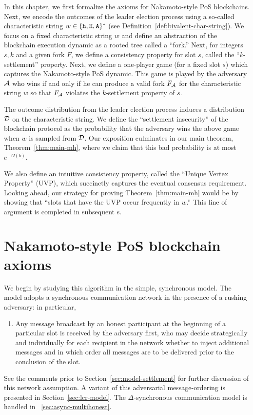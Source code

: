 

In this chapter, 
we first formalize the axioms for Nakamoto-style PoS blockchains. 
Next, we encode the outcomes of the leader election process 
using a so-called characteristic string $w \in \{\mathtt{h}, \mathtt{H}, \mathtt{A}\}^*$ 
(see Definition~\ref{def:bivalent-char-string}). 
We focus on a fixed characteristic string $w$ 
and define an abstraction of the blockchain execution dynamic 
as a rooted tree called a ``fork.'' 
Next, for integers $s, k$ and a given fork $F$, 
we define a consistency property for slot $s$, 
called the ``$k$-settlement'' property.
Next, we define a one-player game (for a fixed slot $s$)
which captures the Nakamoto-style PoS dynamic.
This game is played by the adversary $\mathcal{A}$ 
who wins if and only if he can produce a valid fork $F_{\mathcal{A}}$ 
for the characteristic string $w$ so that 
$F_{\mathcal{A}}$ violates the $k$-settlement property of $s$. 

The outcome distribution from the leader election process 
induces a distribution $\mathcal{D}$ on the characteristic string. 
We define the ``settlement insecurity'' of the blockchain protocol 
as the probability 
that the adversary wins the above game 
when $w$ is sampled from $\mathcal{D}$.
Our exposition culminates in our main theorem, 
Theorem~\ref{thm:main-mh}, 
where we claim that this bad probability is at most $e^{-\Omega(k)}$.

We also define an intuitive consistency property, 
called the ``Unique Vertex Property'' (UVP), 
which succinctly captures the eventual consensus requirement. 
Looking ahead, our strategy for proving Theorem~\ref{thm:main-mh} 
would be by showing that ``slots that have the UVP occur frequently in $w$.'' 
This line of argument is completed in subsequent {\Section}s.


\section{Nakamoto-style PoS blockchain axioms}\label{sec:pos-axioms}

  We begin by studying this algorithm in the simple, synchronous model. 
  The model adopts a
  synchronous communication network in the presence of a rushing
  adversary: in particular,
  \begin{enumerate}[label={\textbf{A\arabic*}}., ref={\textbf{A\arabic*}}, series=axiom, start = 0]
    \item\label{axiom:message-delivery} 
    Any message broadcast by an honest participant at the beginning of a
    particular slot is received by the adversary first, who may decide
    strategically and individually for each recipient in the network
    whether to inject additional messages and in which order all messages
    are to be delivered prior to the conclusion of the slot. 
  \end{enumerate}
  See the comments prior to Section~\ref{sec:model-settlement} for
  further discussion of this network assumption.  A variant of this
  adversarial message-ordering is presented in
  Section~\ref{sec:lcr-model}.  The $\Delta$-synchronous communication
  model is handled in \Section~\ref{sec:async-multihonest}.


